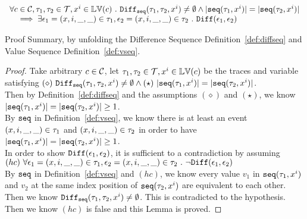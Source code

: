 %
\begin{lem}
	\label{lem:diffval_inv}
\[
	\begin{array}{l}
	\forall c \in \mathcal{C}, \mathtt{\tau}_1, \mathtt{\tau}_2 \in \mathcal{T}, x^i \in \mathbb{LV}(c) ~.~   
	\mathtt{Diff}_{\mathtt{seq}}(\mathtt{\tau}_1, \mathtt{\tau}_2, x^i) \neq \emptyset \land |\mathtt{seq}(\mathtt{\tau}_1, x^i)| = |\mathtt{seq}(\mathtt{\tau}_2, x^i)|
	\\ \quad \implies
	\exists \mathtt{\epsilon}_1 = (x, i, \_, \_) \in \mathtt{\tau}_1, \mathtt{\epsilon}_2 = (x, i, \_, \_) \in \mathtt{\tau}_2 ~.~   \mathtt{Diff}(\mathtt{\epsilon}_1, \mathtt{\epsilon}_2)
\end{array}
\]
\end{lem}
Proof Summary, by unfolding the Difference Sequence Definition~\ref{def:diffseq} and Value Sequence Definition~\ref{def:vseq}.
\begin{proof}
	Take arbitrary $c \in \mathcal{C}$,
%
let $\mathtt{\tau}_1, \mathtt{\tau}_2 \in \mathcal{T}, x^i\in \mathbb{LV}(c)$ 
be the traces and variable satisfying 
$(\diamond) ~ \sdiff(\trace_1, \trace_2, x^i) \neq \emptyset 
\land 
(\star)~|\seq(\trace_1, x^i)| = |\seq(\trace_2, x^i)|$.
\\
Then by Definition~\ref{def:diffseq} and the assumptions $(\diamond)$ and $(\star)$,
we know $|\mathtt{seq}(\mathtt{\tau}_1, x^i)| = |\mathtt{seq}(\mathtt{\tau}_2, x^i)| \geq 1$.
\\
By $\mathtt{seq}$ in Definition~\ref{def:vseq}, we know there is at least an event $(x, i, \_, \_) \in \mathtt{\tau}_1$ and 
$(x, i, \_, \_) \in \mathtt{\tau}_2$
in order to have $|\mathtt{seq}(\mathtt{\tau}_1, x^i)| = |\mathtt{seq}(\mathtt{\tau}_2, x^i)| \geq 1$.
\\
In order to show $\mathtt{Diff}(\mathtt{\epsilon}_1, \mathtt{\epsilon}_2)$, it is sufficient to a contradiction 
by assuming 
\\
$(hc)~ \forall \mathtt{\epsilon}_1 = (x, i, \_, \_) \in \mathtt{\tau}_1, \mathtt{\epsilon}_2 = (x, i, \_, \_) \in \mathtt{\tau}_2 ~.~   \neg \mathtt{Diff}(\mathtt{\epsilon}_1, \mathtt{\epsilon}_2)$
\\
By $\mathtt{seq}$ in Definition~\ref{def:vseq} and $(hc)$, we know every value $v_1$ in $\mathtt{seq}(\mathtt{\tau}_1, x^i)$ and $v_2$ at the same
index position of $\mathtt{seq}(\mathtt{\tau}_2, x^i)$
are equivalent to each other.
\\
Then we know $\mathtt{Diff}_{\mathtt{seq}}(\mathtt{\tau}_1, \mathtt{\tau}_2, x^i) \neq \emptyset$. This is contradicted to the hypothesis.
\\
Then we know $(hc)$ is false and this Lemma is proved.
%
\end{proof}

